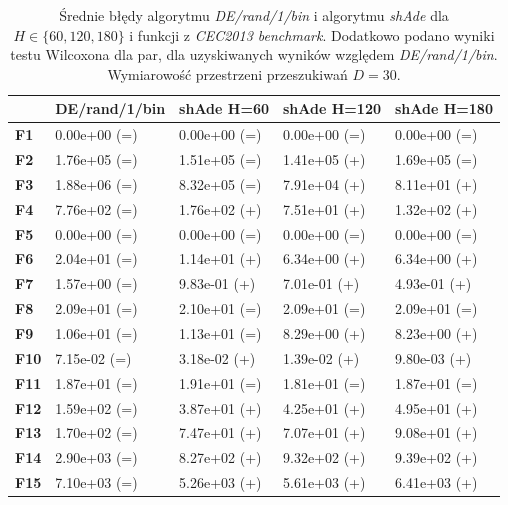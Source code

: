 \documentclass[12pt,a4paper]{report}
\begin{document}
{{{{{{{\begin{table}[h]
\centering
\caption{Średnie błędy algorytmu \emph{DE/rand/1/bin} i algorytmu \emph{shAde} dla $H \in \{60, 120, 180\}$ i funkcji z \emph{CEC2013 benchmark}. Dodatkowo podano wyniki testu Wilcoxona dla par, dla uzyskiwanych wyników względem \emph{DE/rand/1/bin}. Wymiarowość przestrzeni przeszukiwań $D = 30$.}
\label{Anal13}
\begin{tabular}{|l|l|l|l|l|}
\hline
          & {\bf DE/rand/1/bin} & {\bf shAde H=60} & {\bf shAde H=120} & {\bf shAde H=180} \\ \hline
{\bf F1}  & 0.00e+00 (=)        & 0.00e+00 (=)     & 0.00e+00 (=)      & 0.00e+00 (=)      \\ \hline
{\bf F2}  & 1.76e+05 (=)        & 1.51e+05 (=)     & 1.41e+05 (+)      & 1.69e+05 (=)      \\ \hline
{\bf F3}  & 1.88e+06 (=)        & 8.32e+05 (=)     & 7.91e+04 (+)      & 8.11e+01 (+)      \\ \hline
{\bf F4}  & 7.76e+02 (=)        & 1.76e+02 (+)     & 7.51e+01 (+)      & 1.32e+02 (+)      \\ \hline
{\bf F5}  & 0.00e+00 (=)        & 0.00e+00 (=)     & 0.00e+00 (=)      & 0.00e+00 (=)      \\ \hline
{\bf F6}  & 2.04e+01 (=)        & 1.14e+01 (+)     & 6.34e+00 (+)      & 6.34e+00 (+)      \\ \hline
{\bf F7}  & 1.57e+00 (=)        & 9.83e-01 (+)     & 7.01e-01 (+)      & 4.93e-01 (+)      \\ \hline
{\bf F8}  & 2.09e+01 (=)        & 2.10e+01 (=)     & 2.09e+01 (=)      & 2.09e+01 (=)      \\ \hline
{\bf F9}  & 1.06e+01 (=)        & 1.13e+01 (=)     & 8.29e+00 (+)      & 8.23e+00 (+)      \\ \hline
{\bf F10} & 7.15e-02 (=)        & 3.18e-02 (+)     & 1.39e-02 (+)      & 9.80e-03 (+)      \\ \hline
{\bf F11} & 1.87e+01 (=)        & 1.91e+01 (=)     & 1.81e+01 (=)      & 1.87e+01 (=)      \\ \hline
{\bf F12} & 1.59e+02 (=)        & 3.87e+01 (+)     & 4.25e+01 (+)      & 4.95e+01 (+)      \\ \hline
{\bf F13} & 1.70e+02 (=)        & 7.47e+01 (+)     & 7.07e+01 (+)      & 9.08e+01 (+)      \\ \hline
{\bf F14} & 2.90e+03 (=)        & 8.27e+02 (+)     & 9.32e+02 (+)      & 9.39e+02 (+)      \\ \hline
{\bf F15} & 7.10e+03 (=)        & 5.26e+03 (+)     & 5.61e+03 (+)      & 6.41e+03 (+)      \\ \hline

\end{tabular}
\end{table}}}}}}}}
\end{document}
